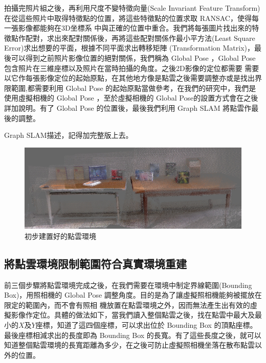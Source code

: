      
    拍攝完照片組之後，再利用尺度不變特徵向量(Scale Invariant Feature Transform)在從這些照片中取得特徵點的位置，將這些特徵點的位置求取 RANSAC，使得每一張影像都能夠在3D坐標系
    中與正確的位置中重合。我們將每張圖片找出來的特徵點作配對，求出來配對關係後，再將這些配對關係作最小平方法(Least Square Error)求出想要的平面，根據不同平面求出轉移矩陣
     (Transformation Matrix)，最後可以得到之前照片影像位置的絕對關係，我們稱為 Global Pose ，Global Pose 包含照片在三維座標以及照片在當時拍攝的角度。之後2D影像的定位都需要
    需要以它作每張影像定位的起始原點，在其他地方像是點雲之後需要調整亦或是找出界限範圍,都需要利用 Global Pose 的起始原點當做參考，在我們的研究中，我們是使用虛擬相機的
     Global Pose ，至於虛擬相機的 Global Pose的設置方式會在之後詳加說明。有了 Global Pose 的位置後，最後我們利用 Graph SLAM 將點雲作最後的調整。
   
    Graph SLAM描述，記得加完整版上去。     
          

\begin{figure}
  \includegraphics[width=\textwidth]{figures/3DPoint_Cloud_Map.jpg}
  \caption{初步建置好的點雲環境}
  \label{fig:Point Cloud Map}
\end{figure}


\subsection{將點雲環境限制範圍符合真實環境重建}
     
%     
    前三個步驟將點雲環境完成之後，在我們需要在環境中制定界線範圍(Bounding Box)，用照相機的 Global Pose 調整角度。目的是為了讓虛擬照相機能夠被擺放在限定的範圍內，而不會有照相
    機放置在點雲環境之外，因而無法產生出有效的虛擬影像作定位。具體的做法如下，當我們讀入整個點雲之後，找在點雲中最大及最小的$X$及$Y$座標，知道了這四個座標，可以求出位於 Bounding
     Box 的頂點座標。最後座標相減求出的長度即為 Bounding Box 的長寬。有了這些長度之後，就可以知道整個點雲環境的長寬距離為多少，在之後可防止虛擬照相機坐落在散布點雲以外的位置。


